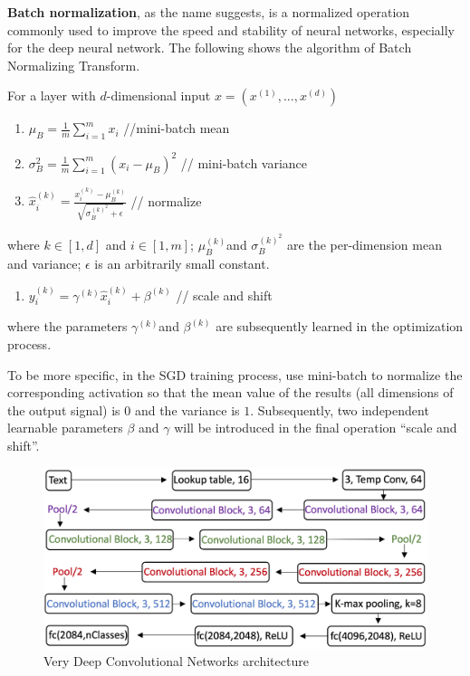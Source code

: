 \documentclass[]{krantz}
\providecommand{\tightlist}{%
  \setlength{\itemsep}{0pt}\setlength{\parskip}{0pt}}
\begin{document}
\textbf{Batch normalization}, as the name suggests, is a normalized operation commonly used to improve the speed and stability of neural networks, especially for the deep neural network. The following shows the algorithm of Batch Normalizing Transform.

For a layer with \(d\)-dimensional input \(x = (x^{(1)},...,x^{(d)})\)

\begin{enumerate}
\def\labelenumi{\arabic{enumi}.}
\item
  \(\mu_B = \frac 1 m \sum_{i=1}^m x_i\) //mini-batch mean
\item
  \(\sigma_B^2 = \frac 1 m \sum_{i=1}^m (x_i-\mu_B)^2\) // mini-batch variance
\item
  \(\hat{x}_{i}^{(k)} = \frac {x_i^{(k)}-\mu_B^{(k)}}{\sqrt{\sigma_B^{(k)^2}+\epsilon}}\) // normalize
\end{enumerate}

where \(k \in [1,d]\) and \(i \in [1,m]\); \(\mu_B^{(k)}\)and \(\sigma_B^{(k)^2}\) are the per-dimension mean and variance; \(\epsilon\) is an arbitrarily small constant.

\begin{enumerate}
\def\labelenumi{\arabic{enumi}.}
\setcounter{enumi}{3}
\tightlist
\item
  \(y_i^{(k)} = \gamma^{(k)} \hat{x}_{i}^{(k)} +\beta^{(k)}\) // scale and shift
\end{enumerate}

where the parameters \(\gamma^{(k)}\)and \(\beta^{(k)}\) are subsequently learned in the optimization process.

To be more specific, in the SGD training process, use mini-batch to normalize the corresponding activation so that the mean value of the results (all dimensions of the output signal) is \(0\) and the variance is \(1\). Subsequently, two independent learnable parameters \(\beta\) and \(\gamma\) will be introduced in the final operation ``scale and shift''.

\begin{figure}[ht]

{\centering \includegraphics[width=0.65\linewidth]{figures/01-03-cnns-and-their-applications-in-nlp/VDCNN} 

}

\caption{\label{fig:fig_10} Very Deep Convolutional Networks architecture}\label{fig:figs-10}
\end{figure}
\end{document}

